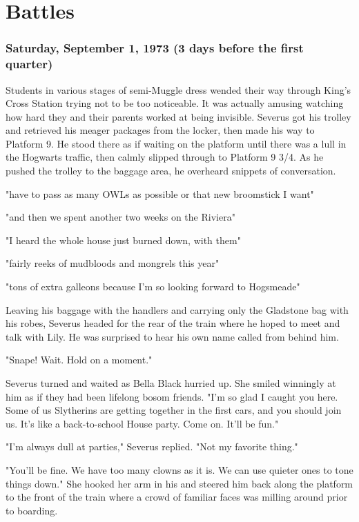 
\chapter{Battles}

\subsection{Saturday, September 1, 1973 (3 days before the first quarter)}

Students in various stages of semi-Muggle dress wended their way through King's Cross Station trying not to be too noticeable. It was actually amusing watching how hard they and their parents worked at being invisible. Severus got his trolley and retrieved his meager packages from the locker, then made his way to Platform 9. He stood there as if waiting on the platform until there was a lull in the Hogwarts traffic, then calmly slipped through to Platform 9 3/4. As he pushed the trolley to the baggage area, he overheard snippets of conversation.

"{\el}have to pass as many OWLs as possible or that new broomstick I want{\el}"

"{\el}and then we spent another two weeks on the Riviera{\el}"

"{\el}I heard the whole house just burned down, with them{\el}"

"{\el}fairly reeks of mudbloods and mongrels this year{\el}"

"{\el}tons of extra galleons because I'm so looking forward to Hogsmeade{\el}"

Leaving his baggage with the handlers and carrying only the Gladstone bag with his robes, Severus headed for the rear of the train where he hoped to meet and talk with Lily. He was surprised to hear his own name called from behind him.

"Snape! Wait. Hold on a moment."

Severus turned and waited as Bella Black hurried up. She smiled winningly at him as if they had been lifelong bosom friends. "I'm so glad I caught you here. Some of us Slytherins are getting together in the first cars, and you should join us. It's like a back-to-school House party. Come on. It'll be fun."

"I'm always{\el} dull at{\el} parties," Severus replied. "Not my favorite{\el} thing."

"You'll be fine. We have too many clowns as it is. We can use quieter ones to tone things down." She hooked her arm in his and steered him back along the platform to the front of the train where a crowd of familiar faces was milling around prior to boarding.

